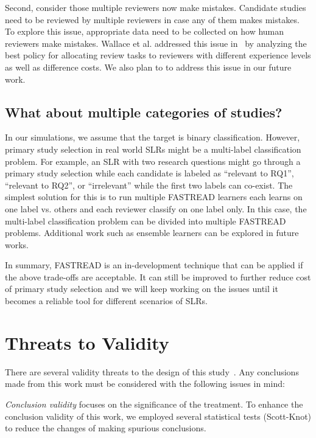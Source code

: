 \documentclass{svjour3}
\theoremstyle{break}
\begin{document}
Second, consider those multiple reviewers now make mistakes. Candidate studies need to be reviewed by multiple reviewers in case any of them makes mistakes. To explore this issue, appropriate data need to be collected on how human reviewers make mistakes. Wallace et al. addressed this issue in~\cite{nguyen2015combining} by analyzing the best policy for allocating review tasks to reviewers with different experience levels as well as difference costs. We also plan to to address this issue in our future work.


\subsection{What about multiple categories of studies?}

In our simulations, we assume that the target is binary classification. However, primary study selection in real world SLRs might be a multi-label classification problem. For example, an SLR with two research questions might go through a primary study selection while each candidate is labeled as ``relevant to RQ1'', ``relevant to RQ2'', or ``irrelevant'' while the first two labels can co-exist. The simplest solution for this is to run multiple FASTREAD learners each learns on one label vs. others and each reviewer classify on one label only. In this case, the multi-label classification problem can be divided into multiple FASTREAD problems. Additional work such as ensemble learners can be explored in future works.

In summary, FASTREAD is an in-development technique that can be applied if the above trade-offs are acceptable. It can still be improved to further reduce cost of primary study selection and we will keep working on the issues until it becomes a reliable tool for different scenarios of SLRs.



\section{Threats to Validity}
\label{sect: Threats to Validity}

There are several validity threats to the design of this study~\cite{feldt2010validity}. Any conclusions made from this work must be considered with the following issues in mind:

{\em Conclusion validity} focuses on the significance of the treatment. To
enhance the conclusion validity of this work, we employed several statistical
tests (Scott-Knot) to reduce the changes of making spurious conclusions. 
\end{document}
